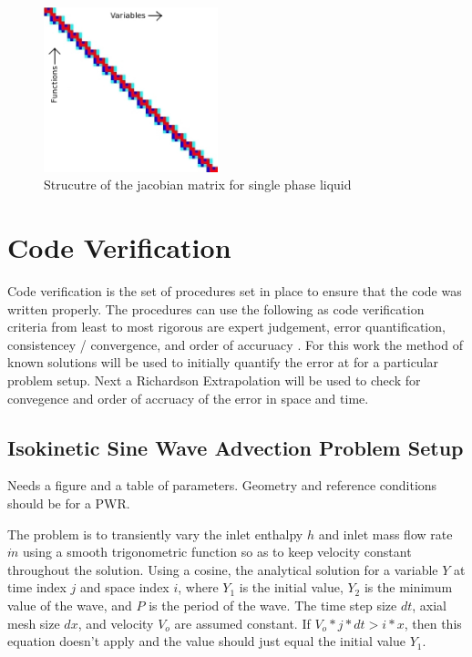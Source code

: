 \documentclass{mc2015}
\begin{document}
    \begin{figure}[!h]
    	\centering
    	\includegraphics[width=0.45\textwidth]{images/Jacobian_Setup}
    	\caption{Strucutre of the jacobian matrix for single phase liquid}
    	\label{fig:Jacobian_Setup}
    \end{figure}

\section{Code Verification}

Code verification is the set of procedures set in place to ensure that the code
was written properly. The procedures can use the following as code verification
criteria from least to most rigorous are expert judgement, error quantification,
consistencey / convergence, and order of accuruacy \cite{VV_Book}. For this work
the method of known solutions will be used to initially quantify the error at
for a particular problem setup. Next a Richardson Extrapolation will be used to
check for convegence and order of accruacy of the error in space and time.
 



\subsection{Isokinetic Sine Wave Advection Problem Setup}

Needs a figure and a table of parameters. Geometry and reference conditions
should be for a PWR.

The problem is to transiently vary the inlet enthalpy $h$ and inlet mass flow
rate $\dot{m}$ using a smooth trigonometric function so as to keep velocity
constant throughout the solution. Using a cosine, the analytical solution for a
variable $Y$ at time index $j$ and space index $i$, where $Y_{1}$ is the initial
value, $Y_{2}$ is the minimum value of the wave, and $P$ is the period of the
wave. The time step size $dt$, axial mesh size $dx$, and velocity $V_{o}$ are
assumed constant. If $V_{o}*j*dt>i*x$, then this equation doesn't apply and the
value should just equal the initial value $Y_{1}$.
\end{document}
